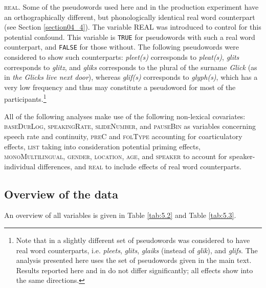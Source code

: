\textsc{real}. Some of the pseudowords used here and in the production experiment have an orthographically different, but phonologically identical real word counterpart (see Section \ref{section04_4}). The variable REAL was introduced to control for this potential confound. This variable is \texttt{TRUE} for pseudowords with such a real word counterpart, and \texttt{FALSE} for those without. The following pseudowords were considered to show such counterparts: \textit{pleet(s)} corresponds to \textit{pleat(s)}, \textit{glits} corresponds to \textit{glitz}, and \textit{gliks} corresponds to the plural of the surname \textit{Glick} (as in \textit{the Glicks live next door}), whereas \textit{glif(s)} corresponds to \textit{glyph(s)}, which has a very low frequency and thus may constitute a pseudoword for most of the participants.\footnote{Note that in \citet{Schmitz2021b} a slightly different set of pseudowords was considered to have real word counterparts, i.e. \textit{pleets}, \textit{glits}, \textit{glaiks} (instead of \textit{glik}), and \textit{glifs}. The analysis presented here uses the set of pseudowords given in the main text. Results reported here and in \citet{Schmitz2021b} do not differ significantly; all effects show into the same directions.}  

All of the following analyses make use of the following non-lexical covariates: \textsc{baseDurLog}, \textsc{speakingRate}, \textsc{slideNumber}, and \textsc{pauseBin} as variables concerning speech rate and continuity, \textsc{preC} and \textsc{folType} accounting for coarticulatory effects, \textsc{list} taking into consideration potential priming effects, \textsc{monoMultilingual}, \textsc{gender}, \textsc{location}, \textsc{age}, and \textsc{speaker} to account for speaker-individual differences, and \textsc{real} to include effects of real word counterparts.

\subsection{Overview of the data}\label{section05_2_2}

An overview of all variables is given in Table \ref{tab:5.2} and Table \ref{tab:5.3}.

